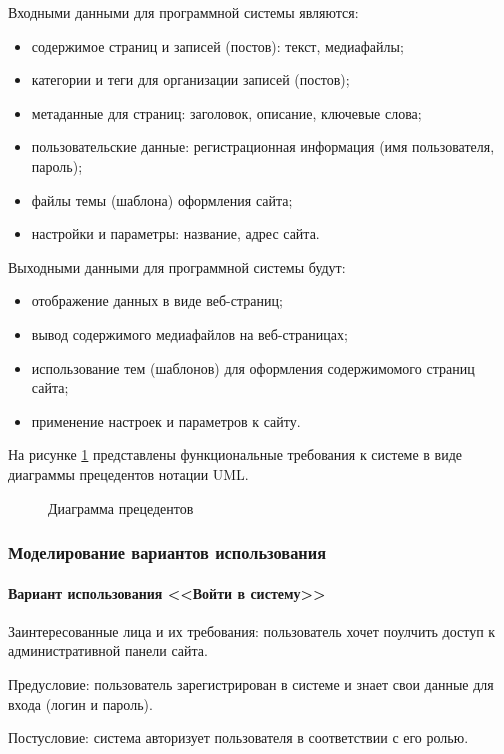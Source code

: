 Входными данными для программной системы являются:
\begin{itemize}
	\item содержимое страниц и записей (постов): текст, медиафайлы;
	\item категории и теги для организации записей (постов);
	\item метаданные для страниц: заголовок, описание, ключевые слова;
	\item пользовательские данные: регистрационная информация (имя пользователя, пароль);
	\item файлы темы (шаблона) оформления сайта;
	\item настройки и параметры: название, адрес сайта.
\end{itemize}

Выходными данными для программной системы будут:
\begin{itemize}
	\item отображение данных в виде веб-страниц;
	\item вывод содержимого медиафайлов на веб-страницах;
	\item использование тем (шаблонов) для оформления содержимомого страниц сайта;
	\item применение настроек и параметров к сайту.
\end{itemize}

На рисунке \ref{usecase:image} представлены функциональные требования к системе в виде диаграммы прецедентов нотации UML.

\begin{figure}[H]
	\caption{Диаграмма прецедентов}
	\label{usecase:image}
\end{figure}

\subsubsection{Моделирование вариантов использования}
\paragraph{Вариант использования <<Войти в систему>>}
Заинтересованные лица и их требования: пользователь хочет поулчить доступ к административной панели сайта.

Предусловие: пользователь зарегистрирован в системе и знает свои данные для входа (логин и пароль).

Постусловие: система авторизует пользователя в соответствии с его ролью.

